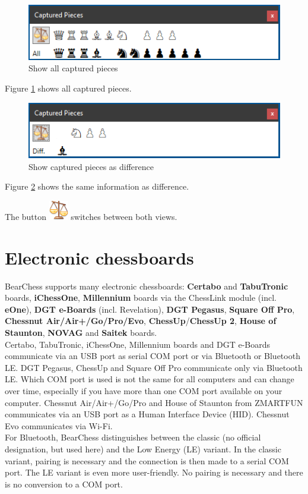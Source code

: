 \documentclass[11pt,a4paper]{article}
\begin{document}
	\begin{figure}[H]
		\centering
		\includegraphics[scale=1.0]{CapturedPieces3.png}
		\caption{Show all captured pieces }
		\label{fig:CapturedPieces3}
	\end{figure}
	
	Figure \ref{fig:CapturedPieces3} shows all captured pieces.
	
	\begin{figure}[H]
		\centering
		\includegraphics[scale=1.0]{CapturedPieces4.png}
		\caption{Show captured pieces as difference}
		\label{fig:CapturedPieces4}
	\end{figure}
	Figure \ref{fig:CapturedPieces4} shows the same information as difference.
	
	The button \includegraphics[scale=0.5]{balance_unbalance.png} switches between both views.
	
	
	\section{Electronic chessboards} \label{ElectronicChessBoard}
	BearChess supports many electronic chessboards: \textbf{Certabo} and \textbf{TabuTronic}  boards, \textbf{iChessOne}, \textbf{Millennium} boards via the ChessLink module (incl. \textbf{eOne}), \textbf{DGT e-Boards} (incl. Revelation), \textbf{DGT Pegasus}, \textbf{Square Off Pro},\\ \textbf{Chessnut Air/Air+/Go/Pro/Evo}, \textbf{ChessUp}/\textbf{ChessUp 2}, \textbf{House of Staunton}, \textbf{NOVAG} and \textbf{Saitek} boards.
	\\Certabo, TabuTronic, iChessOne, Millennium boards and DGT e-Boards communicate via an USB port as serial COM port or via Bluetooth or Bluetooth LE. DGT Pegasus, ChessUp and Square Off Pro communicate only via Bluetooth LE. Which COM port is used is not the same for all computers and can change over time, especially if you have more than one COM port available on your computer. Chessnut Air/Air+/Go/Pro and House of Staunton from ZMARTFUN communicates via an USB port as a Human Interface Device (HID). Chessnut Evo
	communicates via Wi-Fi.\\ 
	For Bluetooth, BearChess distinguishes between the classic (no official designation, but used here) and the Low Energy (LE) variant.
	In the classic variant, pairing is necessary and the connection is then made to a serial COM port. The LE variant is even more user-friendly. No pairing is necessary and there is no conversion to a COM port.
\end{document}

